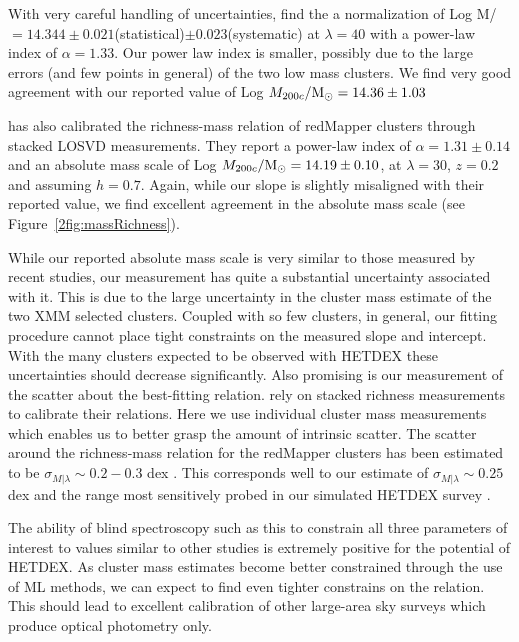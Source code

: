 With very careful handling of uncertainties, \cite{Simet2016} find the a normalization of Log M/\Msol\ $=14.344\pm0.021$(statistical)$\pm0.023$(systematic) at $\lambda=40$ with a power-law index of $\alpha=1.33$. Our power law index is smaller, possibly due to the large errors (and few points in general) of the two low mass clusters. We find very good agreement with our reported value of Log $M_{200c}/\hbox{$\mathrm{M}_\odot$} = 14.36\pm1.03$

\cite{Farahi2016} has also calibrated the richness-mass relation of redMapper clusters through stacked LOSVD measurements. They report a power-law index of $\alpha=1.31\pm0.14$ and an absolute mass scale of Log $M_{200c}/\hbox{$\mathrm{M}_\odot$} = 14.19\pm0.10$, at $\lambda=30$, $z=0.2$ and assuming $h=0.7$. Again, while our slope is slightly misaligned with their reported value, we find excellent agreement in the absolute mass scale (see Figure~\ref{2fig:massRichness}).

While our reported absolute mass scale is very similar to those measured by recent studies, our measurement has quite a substantial uncertainty associated with it. This is due to the large uncertainty in the cluster mass estimate of the two XMM selected clusters. Coupled with so few clusters, in general, our fitting procedure cannot place tight constraints on the measured slope and intercept. With the many clusters expected to be observed with HETDEX these uncertainties should decrease significantly.  
Also promising is our measurement of the scatter about the best-fitting relation. \cite{Farahi2016, Simet2016} rely on stacked richness measurements to calibrate their relations. Here we use individual cluster mass measurements which enables us to better grasp the amount of intrinsic scatter. The scatter around the richness-mass relation for the redMapper clusters has been estimated to be $\sigma_{M|\lambda} \sim 0.2-0.3$ dex \citep{Rozo2014, Rozo2015}. This corresponds well to our estimate of $\sigma_{M|\lambda} \sim 0.25$ dex and the range most sensitively probed in our simulated HETDEX survey .

The ability of blind spectroscopy such as this to constrain all three parameters of interest to values similar to other studies is extremely positive for the potential of HETDEX. As cluster mass estimates become better constrained through the use of ML methods, we can expect to find even tighter constrains on the relation. This should lead to excellent calibration of other large-area sky surveys which produce optical photometry only. 

